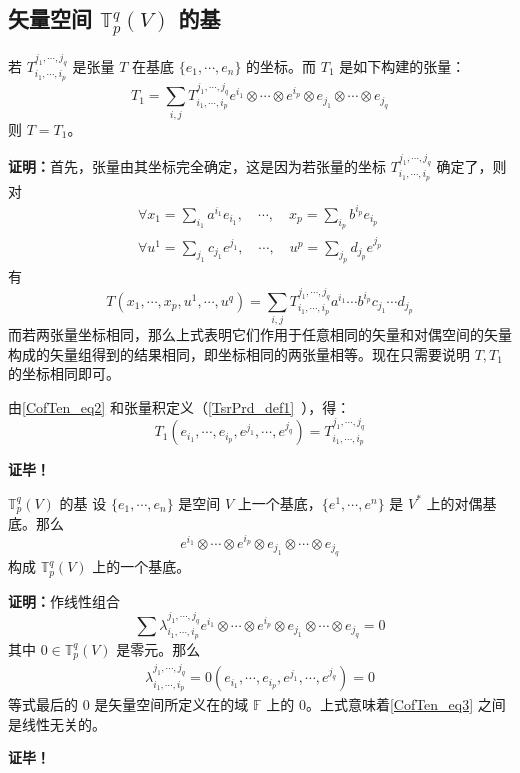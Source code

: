 \subsection{矢量空间 $\mathbb T^q_p(V)$ 的基}
\begin{theorem}{}\label{CofTen_the1}
若 $T^{j_1,\cdots,j_q}_{i_1,\cdots,i_p}$ 是张量 $T$ 在基底 $\{e_1,\cdots,e_n\}$ 的坐标。而 $T_1$ 是如下构建的张量：
\begin{equation}\label{CofTen_eq2}
T_1=\sum_{i,j}T^{j_1,\cdots,j_q}_{i_1,\cdots,i_p}e^{i_1}\otimes\cdots\otimes e^{i_p}\otimes e_{j_1}\otimes\cdots\otimes e_{j_q}
\end{equation}
则 $T=T_1$。
\end{theorem}
\textbf{证明：}首先，张量由其坐标完全确定，这是因为若张量的坐标 $T^{j_1,\cdots,j_q}_{i_1,\cdots,i_p}$ 确定了，则对
\begin{equation}
\begin{aligned}
\forall x_1=\sum_{i_1}a^{i_1}e_{i_1},\quad\cdots,\quad x_p=\sum_{i_p}b^{i_p}e_{i_p}\\
\forall u^1=\sum_{j_1}c_{j_1}e^{j_1},\quad\cdots,\quad u^p=\sum_{j_p}d_{j_p}e^{j_p}
\end{aligned}
\end{equation}
有 
\begin{equation}\label{CofTen_eq1}
T(x_1,\cdots,x_p,u^1,\cdots,u^q)=\sum_{i,j}T^{j_1,\cdots,j_q}_{i_1,\cdots,i_p}a^{i_1}\cdots b^{i_p}c_{j_1}\cdots d_{j_p}
\end{equation}
而若两张量坐标相同，那么上式表明它们作用于任意相同的矢量和对偶空间的矢量构成的矢量组得到的结果相同，即坐标相同的两张量相等。现在只需要说明 $T,T_1$ 的坐标相同即可。

由\autoref{CofTen_eq2} 和张量积定义（\autoref{TsrPrd_def1}~），得：
\begin{equation}
T_1(e_{i_1},\cdots,e_{i_p},e^{j_1},\cdots,e^{j_q})=T^{j_1,\cdots,j_q}_{i_1,\cdots,i_p}
\end{equation}

\textbf{证毕！}
 \begin{theorem}{ $\mathbb T^q_p(V)$ 的基}\label{CofTen_the2}
 设 $\{e_1,\cdots,e_n\}$ 是空间 $V$ 上一个基底，$\{e^1,\cdots,e^n\}$ 是 $V^*$ 上的对偶基底。那么
\begin{equation}\label{CofTen_eq3}
e^{i_1}\otimes\cdots\otimes e^{i_p}\otimes e_{j_1}\otimes\cdots\otimes e_{j_q}
\end{equation}
构成 $\mathbb T_p^q(V)$ 上的一个基底。 
 \end{theorem}
 \textbf{证明：}作线性组合
 \begin{equation}
 \sum\lambda^{j_1,\cdots,j_q}_{i_1,\cdots,i_p}e^{i_1}\otimes\cdots\otimes e^{i_p}\otimes e_{j_1}\otimes\cdots\otimes e_{j_q}=0
 \end{equation}
 其中 $0\in \mathbb T^q_p(V)$ 是零元。那么
 \begin{equation}
 \begin{aligned}
 \lambda^{j_1,\cdots,j_q}_{i_1,\cdots,i_p}=0(e_{i_1},\cdots,e_{i_p},e^{j_1},\cdots,e^{j_q})=0
 \end{aligned}
 \end{equation}
等式最后的 $0$ 是矢量空间所定义在的域 $\mathbb F$ 上的 $0$。上式意味着\autoref{CofTen_eq3} 之间是线性无关的。

\textbf{证毕！}